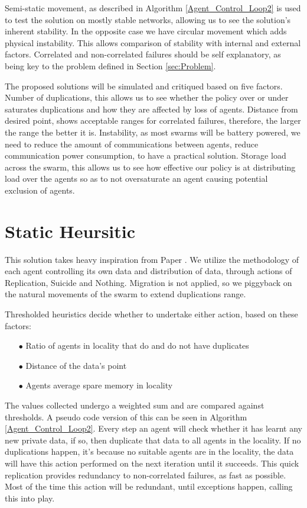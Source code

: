 \documentclass{UoYCSproject}
\begin{document}
Semi-static movement, as described in Algorithm \ref{Agent_Control_Loop2} is used to test the solution on mostly stable networks, allowing us to see the solution's inherent stability.
In the opposite case we have circular movement which adds physical instability.
This allows comparison of stability with internal and external factors.
Correlated and non-correlated failures should be self explanatory, as being key to the problem defined in Section \ref{sec:Problem}.

The proposed solutions will be simulated and critiqued based on five factors.
Number of duplications, this allows us to see whether the policy over or under saturates duplications and how they are affected by loss of agents.
Distance from desired point, shows acceptable ranges for correlated failures, therefore, the larger the range the better it is.
Instability, as most swarms will be battery powered, we need to reduce the amount of communications between agents, reduce communication power consumption, to have a practical solution.
Storage load across the swarm, this allows us to see how effective our policy is at distributing load over the agents so as to not oversaturate an agent causing potential exclusion of agents.


\section{Static Heursitic}
\label{sec:Simple2}

This solution takes heavy inspiration from Paper \cite{Distributed Storage}.
We utilize the methodology of each agent controlling its own data and distribution of data, through actions of Replication, Suicide and Nothing.
Migration is not applied, so we piggyback on the natural movements of the swarm to extend duplications range.

Thresholded heuristics decide whether to undertake either action, based on these factors:

\begin{itemize}
\itemsep-1em
\item[$\bullet$] Ratio of agents in locality that do and do not have duplicates
\item[$\bullet$] Distance of the data’s point
\item[$\bullet$] Agents average spare memory in locality
\end{itemize}

The values collected undergo a weighted sum and are compared against thresholds.
A pseudo code version of this can be seen in Algorithm \ref{Agent_Control_Loop2}.
Every step an agent will check whether it has learnt any new private data, if so, then duplicate that data to all agents in the locality.
If no duplications happen, it’s because no suitable agents are in the locality, the data will have this action performed on the next iteration until it succeeds.
This quick replication provides redundancy to non-correlated failures, as fast as possible.
Most of the time this action will be redundant, until exceptions happen, calling this into play.
\end{document}
